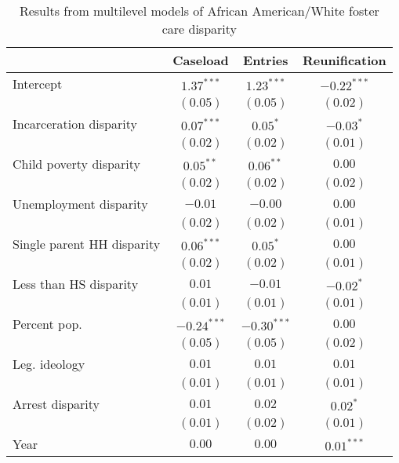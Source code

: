 
\begin{table}
\caption{Results from multilevel models of African American/White foster care disparity}
\begin{center}
\begin{tabular}{l c c c }
\hline
 & Caseload & Entries & Reunification \\
\hline
Intercept                  & $1.37^{***}$  & $1.23^{***}$  & $-0.22^{***}$ \\
                           & $(0.05)$      & $(0.05)$      & $(0.02)$      \\
Incarceration disparity    & $0.07^{***}$  & $0.05^{*}$    & $-0.03^{*}$   \\
                           & $(0.02)$      & $(0.02)$      & $(0.01)$      \\
Child poverty disparity    & $0.05^{**}$   & $0.06^{**}$   & $0.00$        \\
                           & $(0.02)$      & $(0.02)$      & $(0.02)$      \\
Unemployment disparity     & $-0.01$       & $-0.00$       & $0.00$        \\
                           & $(0.02)$      & $(0.02)$      & $(0.01)$      \\
Single parent HH disparity & $0.06^{***}$  & $0.05^{*}$    & $0.00$        \\
                           & $(0.02)$      & $(0.02)$      & $(0.01)$      \\
Less than HS disparity     & $0.01$        & $-0.01$       & $-0.02^{*}$   \\
                           & $(0.01)$      & $(0.01)$      & $(0.01)$      \\
Percent pop.               & $-0.24^{***}$ & $-0.30^{***}$ & $0.00$        \\
                           & $(0.05)$      & $(0.05)$      & $(0.02)$      \\
Leg. ideology              & $0.01$        & $0.01$        & $0.01$        \\
                           & $(0.01)$      & $(0.01)$      & $(0.01)$      \\
Arrest disparity           & $0.01$        & $0.02$        & $0.02^{*}$    \\
                           & $(0.01)$      & $(0.02)$      & $(0.01)$      \\
Year                       & $0.00$        & $0.00$        & $0.01^{***}$  \\

\end{tabular}
\end{center}
\end{table}

